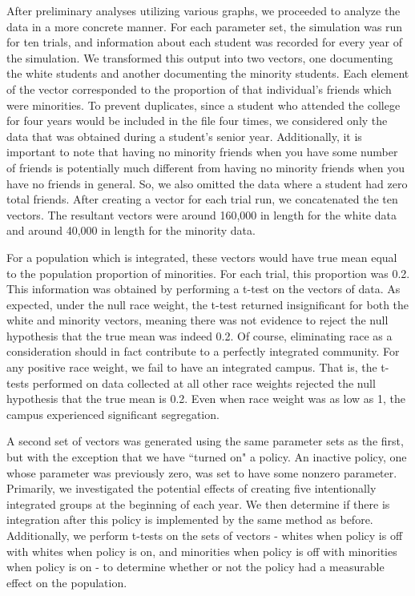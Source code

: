 After preliminary analyses utilizing various graphs, we proceeded to analyze the data in a more concrete manner. For each 
parameter set, the simulation was run for ten trials, and information about each student was recorded for every year of the 
simulation. We transformed this output into two vectors, one documenting the white students and another documenting the 
minority students. Each element of the vector corresponded to the proportion of that individual's friends which were 
minorities. To prevent duplicates, since a student who attended the college for four years would be included in the file four 
times, we considered only the data that was obtained during a student's senior year. Additionally, it is important to note 
that having no minority friends when you have some number of friends is potentially much different from having no 
minority friends when you have no friends in general. So, we also omitted the data where a student had zero total friends. 
After creating a vector for each trial run, we concatenated the ten vectors. The resultant vectors were around 160,000 in 
length for the white data and around 40,000 in length for the minority data.

For a population which is integrated, these vectors would have true mean equal to the population proportion of minorities.
For each trial, this proportion was 0.2. This information was obtained by performing a t-test on the vectors of data. As 
expected, under the null race weight, the t-test returned insignificant for both the white and minority vectors, meaning 
there was not evidence to reject the null hypothesis that the true mean was indeed 0.2. Of course, eliminating race as a 
consideration should in fact contribute to a perfectly integrated community. For any positive race weight, we fail to have 
an integrated campus. That is, the t-tests performed on data collected at all other race weights rejected the null hypothesis 
that the true mean is 0.2. Even when race weight was as low as 1, the campus experienced significant segregation.

A second set of vectors was generated using the same parameter sets as the first, but with the exception that we have ``turned 
on" a policy. An inactive policy, one whose parameter was previously zero, was set to have some nonzero parameter. Primarily, 
we investigated the potential effects of creating five intentionally integrated groups at the beginning of each year. We then 
determine if there is integration after this policy is implemented by the same method as before. Additionally, we perform 
t-tests on the sets of vectors - whites when policy is off with whites when policy is on, and minorities when policy is off 
with minorities when policy is on - to determine whether or not the policy had a measurable effect on the population. 

